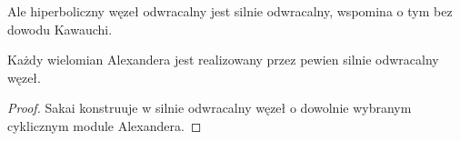 Ale hiperboliczny węzeł odwracalny jest silnie odwracalny, wspomina o tym bez dowodu Kawauchi.

\begin{proposition}
    Każdy wielomian Alexandera jest realizowany przez pewien silnie odwracalny węzeł.
\end{proposition}

\begin{proof}
%
    Sakai konstruuje w \cite{sakai83} silnie odwracalny węzeł o dowolnie wybranym cyklicznym module Alexandera.
\end{proof}


